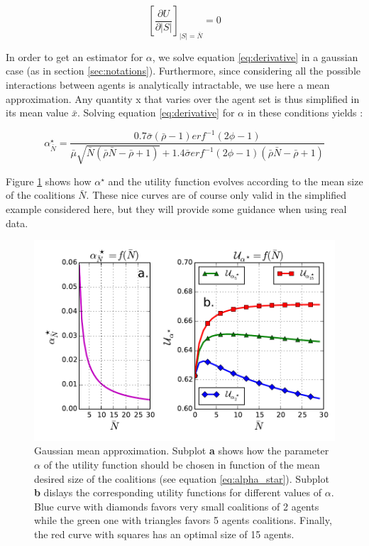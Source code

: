 \documentclass[conference]{IEEEtran}
\begin{document}
\begin{equation}
\left[ \dfrac{\partial{ U}}{ \partial{|S|}} \right]_{|S| = \bar{N}} = 0
\label{eq:derivative}
\end{equation}

In order to get an estimator for $ \alpha $, we solve equation \ref{eq:derivative} in a gaussian case (as in section \ref{sec:notations}). Furthermore, since considering all the possible interactions between agents is analytically intractable, we use here a mean approximation. Any quantity x that varies over the agent set is thus simplified in its mean value $ \bar{x} $. Solving equation \ref{eq:derivative} for $ \alpha $ in these conditions yields :

\footnotesize
\begin{equation}
\alpha^{\star}_{\bar{N}} = \dfrac{0.7 \bar{\sigma}(\bar{\rho}-1)erf^{-1}(2 \phi - 1)}{\bar{\mu}\sqrt{\bar{N}(\bar{\rho}\bar{N}-\bar{\rho}+1)}+1.4 \bar{\sigma} erf^{-1} (2 \phi -1 ) (\bar{\rho}\bar{N}-\bar{\rho} + 1)} 
\label{eq:alpha_star}
\end{equation}
\normalsize

Figure \ref{fig:mean_approx} shows how $ \alpha^{\star} $ and the utility function evolves according to the mean size of the coalitions $ \bar{N} $. These nice curves are of course only valid in the simplified example considered here, but they will provide some guidance when using real data.

\begin{figure}
\includegraphics[scale=.6]{mean_field}
\caption{Gaussian mean approximation. Subplot \textbf{a} shows how the parameter $ \alpha $ of the utility function should be chosen in function of the mean desired size of the coalitions (see equation \ref{eq:alpha_star}). Subplot \textbf{b} dislays the corresponding utility functions for different values of $ \alpha $. Blue curve with diamonds favors very small coalitions of 2 agents while the green one with triangles favors 5 agents coalitions. Finally, the red curve with squares has an optimal size of 15 agents. }
\label{fig:mean_approx}
\end{figure}
\end{document}
